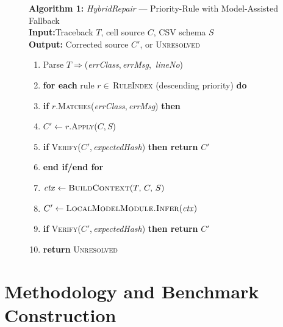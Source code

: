 \documentclass[conference]{IEEEtran}
\begin{document}
\begin{figure}[t]
\begin{framed}
\footnotesize
\noindent\textbf{Algorithm 1:} \textit{HybridRepair} —
Priority-Rule with Model-Assisted Fallback\\[3pt]
\textbf{Input:}\enspace Traceback $T$, cell source $C$, CSV schema $S$\\
\textbf{Output:} Corrected source $C'$, or \textsc{Unresolved}\\[4pt]
\begin{enumerate}[leftmargin=2em,label=\textbf{\arabic*.},nosep,
                  itemsep=2pt]
  \item Parse $T\Rightarrow$(\textit{errClass},\,\textit{errMsg},\,
        \textit{lineNo})
  \item \textbf{for each} rule $r\in$\,\textsc{RuleIndex}
        (descending priority) \textbf{do}
  \item \hspace{1.4em}\textbf{if}
        $r$.\textsc{Matches}(\textit{errClass},\,\textit{errMsg})
        \textbf{then}
  \item \hspace{2.8em}$C'\gets r$.\textsc{Apply}($C$,\,$S$)
  \item \hspace{2.8em}\textbf{if}
        \textsc{Verify}($C'$,\,\textit{expectedHash})
        \textbf{then return} $C'$
  \item \hspace{1.4em}\textbf{end if\;/\;end for}
  \item $\mathit{ctx}\gets\textsc{BuildContext}(T,\,C,\,S)$
  \item $C'\gets\textsc{LocalModelModule.Infer}(\mathit{ctx})$
  \item \textbf{if}
        \textsc{Verify}($C'$,\,\textit{expectedHash})
        \textbf{then return} $C'$
  \item \textbf{return} \textsc{Unresolved}
\end{enumerate}
\end{framed}
\vspace{-0.5em}
\label{alg:repair}
\end{figure}

\section{Methodology and Benchmark Construction}
\label{sec:method}
\end{document}

